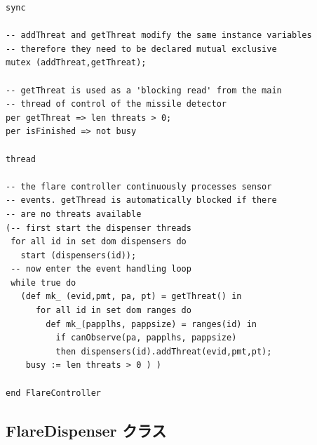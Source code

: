 \documentclass[\pformat,12pt]{jreport}
\begin{document}
\begin{lstlisting}
sync

-- addThreat and getThreat modify the same instance variables
-- therefore they need to be declared mutual exclusive
mutex (addThreat,getThreat);

-- getThreat is used as a 'blocking read' from the main
-- thread of control of the missile detector
per getThreat => len threats > 0;
per isFinished => not busy

thread

-- the flare controller continuously processes sensor
-- events. getThread is automatically blocked if there
-- are no threats available
(-- first start the dispenser threads
 for all id in set dom dispensers do
   start (dispensers(id));
 -- now enter the event handling loop
 while true do
   (def mk_ (evid,pmt, pa, pt) = getThreat() in
      for all id in set dom ranges do
        def mk_(papplhs, pappsize) = ranges(id) in
          if canObserve(pa, papplhs, pappsize)
          then dispensers(id).addThreat(evid,pmt,pt);
    busy := len threats > 0 ) )

end FlareController
\end{lstlisting}

\subsection{FlareDispenser クラス}
\end{document}
